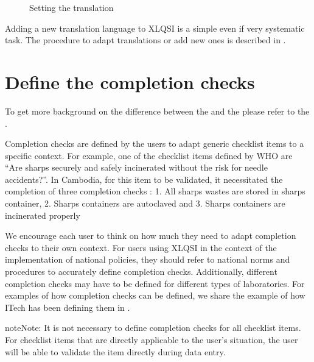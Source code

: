 \documentclass[letterpaper,10pt,english]{sphinxmanual}
\begin{document}
\begin{figure}[htbp]
\centering
\capstart

\noindent{}
\caption{Setting the translation}\label{\detokenize{create_data_entry:translation}}\end{figure}

Adding a new translation language to XLQSI is a simple even if very systematic task. The procedure to adapt translations or add new ones is described in {\hyperref[\detokenize{technical::doc}]{}}.


\section{Define the completion checks}
\label{\detokenize{create_data_entry:define-the-completion-checks}}\label{\detokenize{create_data_entry:id1}}
To get more background on the difference between the  and the  please refer to the {\hyperref[\detokenize{intro::doc}]{}}.

Completion checks are defined by the users to adapt generic checklist items to a specific context. For example, one of the checklist items defined by WHO are “Are sharps securely and safely incinerated without the risk for needle accidents?”. In Cambodia, for this item to be validated, it necessitated the completion of three completion checks :
1. All sharps wastes are stored in sharps container,
2. Sharps containers are autoclaved and
3. Sharps containers are incinerated properly

We encourage each user to think on how much they need to adapt completion checks to their own context. For users using XLQSI in the context of the implementation of national policies, they should refer to national norms and procedures to accurately define completion checks. Additionally, different completion checks may have to be defined for different types of laboratories. For examples of how completion checks can be defined, we share the example of how ITech has been defining them in .

\begin{sphinxadmonition}{note}{Note:}
It is not necessary to define completion checks for all checklist items. For checklist items that are directly applicable to the user’s situation, the user will be able to validate the item directly during data entry.
\end{sphinxadmonition}
\end{document}
